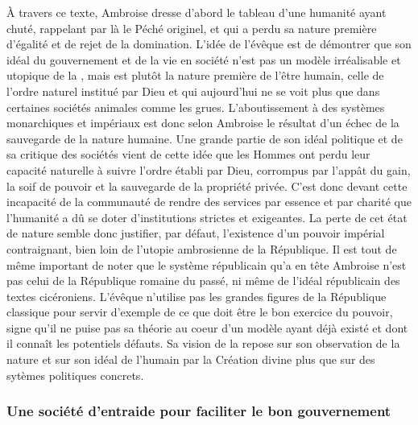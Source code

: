 \bigskip

À travers ce texte, Ambroise dresse d'abord le tableau d'une humanité ayant chuté, rappelant par là le Péché originel, et qui a perdu sa nature première d'égalité et de rejet de la domination. L'idée de l'évêque est de démontrer que son idéal du gouvernement et de la vie en société n'est pas un modèle irréalisable et utopique de la , mais est plutôt la nature première de l'être humain, celle de l'ordre naturel institué par Dieu et qui aujourd'hui ne se voit plus que dans certaines sociétés animales comme les grues. L'aboutissement à des systèmes monarchiques et impériaux est donc selon Ambroise le résultat d'un échec de la sauvegarde de la nature humaine. Une grande partie de son idéal politique et de sa critique des sociétés vient de cette idée que les Hommes ont perdu leur capacité naturelle à suivre l'ordre établi par Dieu, corrompus par l'appât du gain, la soif de pouvoir et la sauvegarde de la propriété privée. C'est donc devant cette incapacité de la communauté de rendre des services par essence et par charité que l'humanité a dû se doter d'institutions strictes et exigeantes. La perte de cet état de nature semble donc justifier, par défaut, l'existence d'un pouvoir impérial contraignant, bien loin de l'utopie ambrosienne de la République. Il est tout de même important de noter que le système républicain qu'a en tête Ambroise n'est pas celui de la République romaine du passé, ni même de l'idéal républicain des textes cicéroniens. L'évêque n'utilise pas les grandes figures de la République classique pour servir d'exemple de ce que doit être le bon exercice du pouvoir, signe qu'il ne puise pas sa théorie au coeur d'un modèle ayant déjà existé et dont il connaît les potentiels défauts. Sa vision de la  repose sur son observation de la nature et sur son idéal de l'humain par la Création divine plus que sur des sytèmes politiques concrets.

\bigskip

\subsubsection{Une société d’entraide pour faciliter le bon gouvernement}


